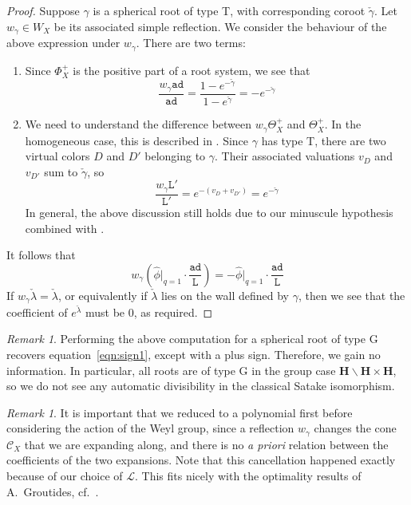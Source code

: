\documentclass{amsart}
\theoremstyle{definition}
\theoremstyle{remark}
\newtheorem{remark}[theorem]{Remark}
\newcommand{\1}{\mathbf{1}}
\newcommand{\sh}[1]{\mathcal{#1}}
\theoremstyle{definition}
\newcommand{\bH}{\mathbf{H}}
\begin{document}
\begin{proof}
  Suppose $\gamma$ is a spherical root of type T, with corresponding coroot $\check\gamma$. Let $w_\gamma\in W_X$ be its associated simple reflection. We consider the behaviour of the above expression under $w_\gamma$. There are two terms:
  \begin{enumerate}
    \item Since $\Phi_X^+$ is the positive part of a root system, we see that
    \[
      \frac{w_\gamma\mathtt{ad}}{\mathtt{ad}}=\frac{1-e^{-\check\gamma}}{1-e^{\check\gamma}}=-e^{-\check\gamma}
    \]
    \item We need to understand the difference between $w_\gamma\Theta_X^+$ and $\Theta_X^+$. In the homogeneous case, this is described in \cite[Statement 7.1.5]{SakSpherical}. Since $\gamma$ has type T, there are two virtual colors $D$ and $D'$ belonging to $\gamma$. Their associated valuations $v_D$ and $v_{D'}$ sum to $\check{\gamma}$, so
    \[
      \frac{w_\gamma\mathtt{L}'}{\mathtt{L}'}=e^{-(v_D+v_{D'})}=e^{-\check{\gamma}}
    \]
    In general, the above discussion still holds due to our minuscule hypothesis combined with \cite[Theorem 7.1.9(iii)]{SakWang}.
  \end{enumerate}
  It follows that
  \begin{equation}\label{eqn:sign1}
    w_\gamma\left(\hat{\phi}|_{q=1}\cdot\frac{\mathtt{ad}}{\mathtt{L}}\right)=-\hat{\phi}|_{q=1}\cdot\frac{\mathtt{ad}}{\mathtt{L}}
  \end{equation}
  If $w_\gamma\check{\lambda}=\check{\lambda}$, or equivalently if $\check{\lambda}$ lies on the wall defined by $\gamma$, then we see that the coefficient of $e^{\check{\lambda}}$ must be 0, as required.
\end{proof}

\begin{remark}\label{rmk:TypeG}
  Performing the above computation for a spherical root of type G recovers equation~\eqref{eqn:sign1}, except with a plus sign. Therefore, we gain no information. In particular, all roots are of type G in the group case $\bH\backslash\bH\times\bH$, so we do not see any automatic divisibility in the classical Satake isomorphism.
\end{remark}

\begin{remark}
  It is important that we reduced to a polynomial first before considering the action of the Weyl group, since a reflection $w_\gamma$ changes the cone $\sh{C}_X$ that we are expanding along, and there is no \emph{a priori} relation between the coefficients of the two expansions. Note that this cancellation happened exactly because of our choice of $\sh{L}$. This fits nicely with the optimality results of A.~Groutides, cf.~\cite{GroutidesRS}.
\end{remark}
\end{document}
